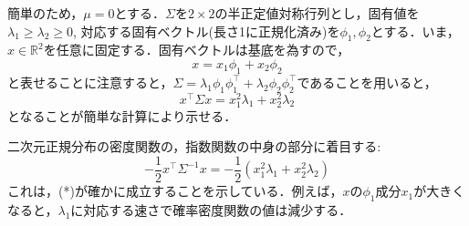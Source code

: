 \documentclass[11pt,a4paper,dvipdfmx]{article}
\theoremstyle{plain}
\newcommand{\R}{\mathbb{R}}
\newcommand{\1}{\mbox{1}\hspace{-0.25em}\mbox{l}}
\begin{document}
簡単のため，$\mu = 0$とする．$\Sigma$を$2 \times 2$の半正定値対称行列とし，固有値を$\lambda_1 \geq \lambda_2 \geq 0$, 対応する固有ベクトル(長さ1に正規化済み)を$\phi_1, \phi_2$とする．いま，$x \in \R^2$を任意に固定する．固有ベクトルは基底を為すので，
$$
x = x_1 \phi_1 + x_2 \phi_2
$$
と表せることに注意すると，$\Sigma = \lambda_1 \phi_1 \phi_1^\top + \lambda_2 \phi_2 \phi_2^\top$であることを用いると，
$$
x^\top \Sigma x = x_1^2 \lambda_1 + x_2^2 \lambda_2
$$
となることが簡単な計算により示せる．

二次元正規分布の密度関数の，指数関数の中身の部分に着目する:
$$
-\frac{1}{2}x^\top \Sigma^{-1} x = - \frac{1}{2}(x_1^2 \lambda_1 + x_2^2 \lambda_2)
$$
これは，(*)が確かに成立することを示している．例えば，$x$の$\phi_1$成分$x_1$が大きくなると，$\lambda_1$に対応する速さで確率密度関数の値は減少する．
\end{document}
